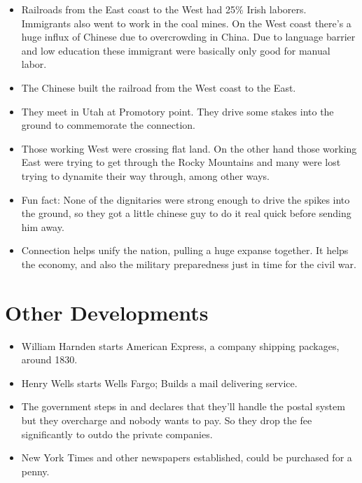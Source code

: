 \documentclass{article}
\begin{document}
\begin{itemize}
      \item Railroads from the East coast to the West had 25\% Irish laborers. Immigrants also went to work in the coal mines. On the West coast there's a huge influx of Chinese due to overcrowding in China. Due to language barrier and low education these immigrant were basically only good for manual labor.
      \item The Chinese built the railroad from the West coast to the East.
      \item They meet in Utah at Promotory point. They drive some stakes into the ground to commemorate the connection.
      \item Those working West were crossing flat land. On the other hand those working East were trying to get through the Rocky Mountains and many were lost trying to dynamite their way through, among other ways.
      \item Fun fact: None of the dignitaries were strong enough to drive the spikes into the ground, so they got a little chinese guy to do it real quick before sending him away. 
      \item Connection helps unify the nation, pulling a huge expanse together. It helps the economy, and also the military preparedness just in time for the civil war. 
    \end{itemize}

\section{Other Developments}
  \begin{itemize}
    \item William Harnden starts American Express, a company shipping packages, around 1830.
    \item Henry Wells starts Wells Fargo; Builds a mail delivering service.
    \item The government steps in and declares that they'll handle the postal system but they overcharge and nobody wants to pay. So they drop the fee significantly to outdo the private companies.
    \item New York Times and other newspapers established, could be purchased for a penny.
  \end{itemize}
\end{document}
